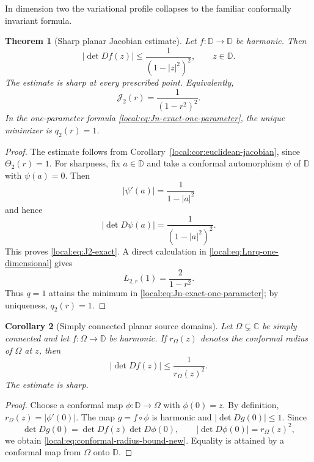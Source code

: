 \documentclass[11pt,reqno]{amsart}
\newtheorem{theorem}{Theorem}[section]
\newtheorem{corollary}[theorem]{Corollary}
\theoremstyle{remark}
\begin{document}
In dimension two the variational profile collapses to the familiar conformally
invariant formula.

\begin{theorem}[Sharp planar Jacobian estimate]
\label{local:thm:planar-jacobian}
Let $f:\mathbb D\to\mathbb D$ be harmonic.  Then
\begin{equation}\label{local:eq:planar-jacobian-new}
 |\det Df(z)|
 \le
 \frac1{(1-|z|^2)^2},
 \qquad z\in\mathbb D.
\end{equation}
The estimate is sharp at every prescribed point.  Equivalently,
\begin{equation}\label{local:eq:J2-exact}
 \mathcal J_2(r)=\frac1{(1-r^2)^2}.
\end{equation}
In the one-parameter formula \eqref{local:eq:Jn-exact-one-parameter}, the unique
minimizer is $q_2(r)=1$.
\end{theorem}

\begin{proof}
The estimate follows from Corollary~\ref{local:cor:euclidean-jacobian}, since
$\Theta_2(r)=1$.  For sharpness, fix $a\in\mathbb D$ and take a conformal
automorphism $\psi$ of $\mathbb D$ with $\psi(a)=0$.  Then
\[
 |\psi'(a)|=\frac1{1-|a|^2}
\]
and hence
\[
 |\det D\psi(a)|
 =
 \frac1{(1-|a|^2)^2}.
\]
This proves \eqref{local:eq:J2-exact}.  A direct calculation in
\eqref{local:eq:Lnrq-one-dimensional} gives
\[
 L_{2,r}(1)=\frac{2}{1-r^2}.
\]
Thus $q=1$ attains the minimum in \eqref{local:eq:Jn-exact-one-parameter}; by
uniqueness, $q_2(r)=1$.
\end{proof}

\begin{corollary}[Simply connected planar source domains]
\label{local:cor:planar-conformal-radius}
Let $\Omega\subsetneq\mathbb C$ be simply connected and let
$f:\Omega\to\mathbb D$ be harmonic.  If $r_\Omega(z)$ denotes the conformal
radius of $\Omega$ at $z$, then
\begin{equation}\label{local:eq:conformal-radius-bound-new}
 |\det Df(z)|
 \le
 \frac1{r_\Omega(z)^2}.
\end{equation}
The estimate is sharp.
\end{corollary}

\begin{proof}
Choose a conformal map $\phi:\mathbb D\to\Omega$ with $\phi(0)=z$.  By
definition, $r_\Omega(z)=|\phi'(0)|$.  The map $g=f\circ\phi$ is harmonic and
$|\det Dg(0)|\le1$.  Since
\[
 \det Dg(0)=\det Df(z)\det D\phi(0),
 \qquad
 |\det D\phi(0)|=r_\Omega(z)^2,
\]
we obtain \eqref{local:eq:conformal-radius-bound-new}.  Equality is attained by a
conformal map from $\Omega$ onto $\mathbb D$.
\end{proof}
\end{document}
